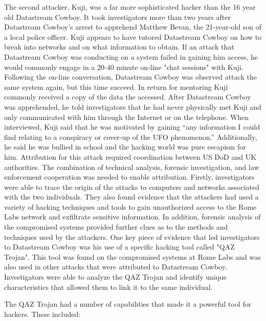 \documentclass[12pt]{report}
\begin{document}
The second attacker, Kuji, was a far more sophisticated hacker than the 16 year old Datastream Cowboy.  It took investigators more than two years after Datastream Cowboy’s arrest to apprehend Matthew Bevan, the 21-year-old son of a local police officer.  Kuji appears to have tutored Datastream Cowboy on how to break into networks and on what information to obtain.  If an attack that Datastream Cowboy was conducting on a system failed in gaining him access, he would commonly engage in a 20-40 minute on-line "chat sessions" with Kuji.  Following the on-line conversation, Datastream Cowboy was observed attack the same system again, but this time succeed.  In return for mentoring Kuji commonly received a copy of the data the accessed.  After Datastream Cowboy was apprehended, he told investigators that he had never physically met Kuji and only communicated with him through the Internet or on the telephone.  When interviewed, Kuji said that he was motivated by gaining “any information I could find relating to a conspiracy or cover-up of the UFO phenomenon.”  Additionally, he said he was bullied in school and the hacking world was pure escapism for him.  
Attribution for this attack required coordination between US DoD and UK authorities.  The combination of technical analysis, forensic investigation, and law enforcement cooperation was needed to enable attribution.  Firstly, investigators were able to trace the origin of the attacks to computers and networks associated with the two individuals. They also found evidence that the attackers had used a variety of hacking techniques and tools to gain unauthorized access to the Rome Labs network and exfiltrate sensitive information.  In addition, forensic analysis of the compromised systems provided further clues as to the methods and techniques used by the attackers.  One key piece of evidence that led investigators to Datastream Cowboy was his use of a specific hacking tool called "QAZ Trojan". This tool was found on the compromised systems at Rome Labs and was also used in other attacks that were attributed to Datastream Cowboy. Investigators were able to analyze the QAZ Trojan and identify unique characteristics that allowed them to link it to the same individual.

The QAZ Trojan had a number of capabilities that made it a powerful tool for hackers. These included:
\end{document}
